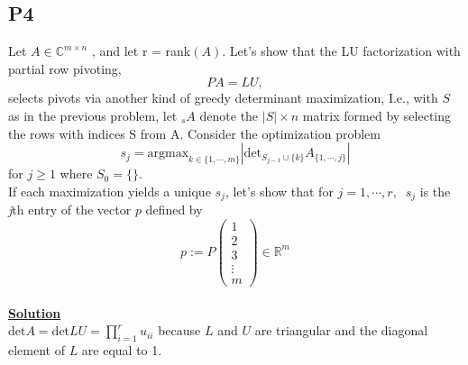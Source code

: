 \documentclass[11pt]{article}
\begin{document}
\subsection*{P4}
Let $A\in \mathbb{C}^{m \times n}$ , and let r = rank$(A)$. Let's show that the LU factorization with partial row pivoting, 
\begin{equation*}
 PA= LU,
\end{equation*}
selects pivots via another kind of greedy determinant maximization, I.e., with $S$ as in the previous problem, let $_sA$ denote the $\left|S\right| \times n$  matrix formed by selecting the rows with indices S from A. Consider the optimization problem
\begin{equation*}
s_j = \text{argmax}_{k \in \{1, \cdots, m\}}\left|\text{det}_{S_{j-1}\cup\{k\}}A_{\{1, \cdots,j\}}\right|  
\end{equation*}
for $j\ge 1$ where $S_0 = \{\}$.\\
If each maximization yields a unique $s_j$, let's show that for $j = 1, \cdots,r, \;\;s_j$ is the \textit{j}th entry of the vector $p$ defined by
\begin{equation*}
p := P
\begin{pmatrix}
1\\
2\\
3\\
\vdots\\
m
\end{pmatrix}
\in \mathbb{R}^{m}
\end{equation*}\\
\underline{\textbf{Solution}}\\
$\text{det}A = \text{det}LU = \prod\limits_{i= 1}^{r}{u_{ii}}$ because $L$ and $U$ are triangular and the diagonal element of $L$ are equal to 1.
\end{document}
